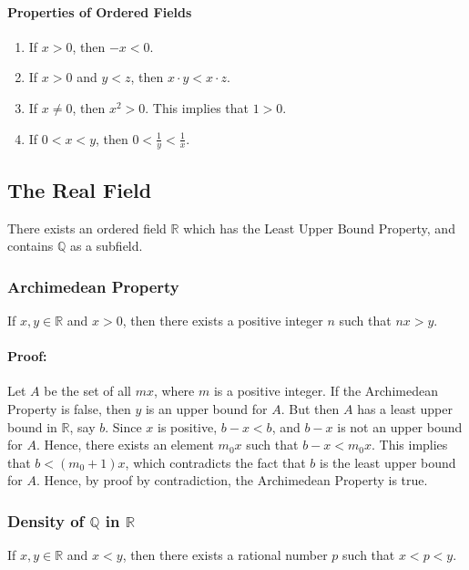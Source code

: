 \documentclass[12pt, oneside]{book}
\theoremstyle{definition}
\begin{document}
\paragraph{Properties of Ordered Fields}
\begin{enumerate}
	\item If \(x > 0\), then \(-x < 0\).
	\item If \(x > 0\) and \(y < z\), then \(x \cdot y < x \cdot z\).
	\item If \(x \neq 0\), then \(x^2 > 0\).
	      This implies that \(1 > 0\).
	\item If \(0 < x < y\), then \(0 < \frac{1}{y} < \frac{1}{x}\).
\end{enumerate}

\subsection{The Real Field}
There exists an ordered field \(\mathbb{R}\) which has the Least Upper Bound Property, and contains \(\mathbb{Q}\) as a subfield.

\subsubsection{Archimedean Property}
If \(x,y \in \mathbb{R}\) and \(x > 0\), then there exists a positive integer \(n\) such that \(nx > y\).

\paragraph{Proof:} Let \(A\) be the set of all \(mx\), where \(m\) is a positive integer.
If the Archimedean Property is false, then \(y\) is an upper bound for \(A\).
But then \(A\) has a least upper bound in \( \mathbb{R} \), say \(b\).
Since \(x\) is positive, \(b-x<b\), and \(b-x\) is not an upper bound for \(A\).
Hence, there exists an element \(m_0x\) such that \(b-x < m_0x\).
This implies that \(b < (m_0+1)x\), which contradicts the fact that \(b\) is the least upper bound for \(A\).
Hence, by proof by contradiction, the Archimedean Property is true.

\subsubsection{Density of \(\mathbb{Q}\) in \(\mathbb{R}\)}
If \(x,y \in \mathbb{R}\) and \(x < y\), then there exists a rational number \(p\) such that \(x < p < y\).
\end{document}
